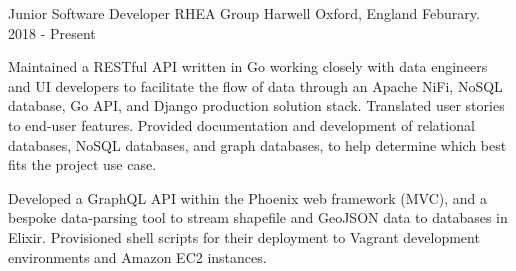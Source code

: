 

\begin{cventries}


  \cventry
    {Junior Software Developer} %
    {RHEA Group} %
    {Harwell Oxford, England} %
    {Feburary. 2018 - Present} %
    {
      \begin{cvitems} %
        \item {Maintained a RESTful API written in Go working closely with data engineers and UI developers to facilitate the flow of data through an Apache NiFi, NoSQL database, Go API, and Django production solution stack. Translated user stories to end-user features. Provided documentation and development of relational databases, NoSQL databases, and graph databases, to help determine which best fits the project use case.}
        \item {Developed a GraphQL API within the Phoenix web framework (MVC), and a bespoke data-parsing tool to stream shapefile and GeoJSON data to databases in Elixir. Provisioned shell scripts for their deployment to Vagrant development environments and Amazon EC2 instances.}
      \end{cvitems}
    }


\end{cventries}
